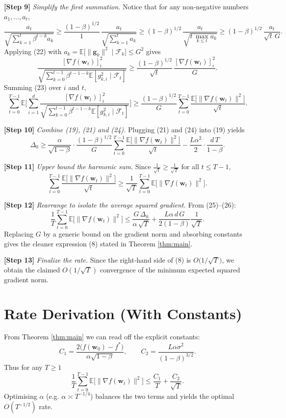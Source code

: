 \documentclass{article}
\newcommand{\EE}{\mathbb{E}}
\begin{document}
\noindent\textbf{[Step 9]} \emph{Simplify the first summation.}  
Notice that for any non‑negative numbers $a_{1},\dots,a_{t}$,
\[
\frac{a_{t}}{\sqrt{\sum_{k=1}^{t}\beta^{t-k}a_{k}}}
\ge \frac{(1-\beta)^{1/2}}{1}\,
\frac{a_{t}}{\sqrt{\sum_{k=1}^{t}a_{k}}}
\ge (1-\beta)^{1/2}\,
\frac{a_{t}}{\sqrt{t\,\max_{k\le t}a_{k}}}\ge
(1-\beta)^{1/2}\,\frac{a_{t}}{\sqrt{t}\,G}.
\tag{22}
\]
Applying (22) with $a_{k}= \EE\!\big[\|\bm g_{k}\|^{2}\mid\mathcal{F}_{k}\big]\le G^{2}$ gives
\[
\frac{[\nabla f(\bm w_{t})]_{i}^{2}}
{\sqrt{\sum_{k=0}^{t-1}\beta^{t-1-k}\EE[g_{k,i}^{2}\mid\mathcal{F}_{t}]}}
\ge
\frac{(1-\beta)^{1/2}}{\sqrt{t}}\,
\frac{[\nabla f(\bm w_{t})]_{i}^{2}}{G}.
\tag{23}
\]
Summing (23) over $i$ and $t$,
\[
\sum_{t=0}^{T-1}\EE\!\Big[
\sum_{i=1}^{d}
\frac{[\nabla f(\bm w_{t})]_{i}^{2}}
{\sqrt{\sum_{k=0}^{t-1}\beta^{t-1-k}\EE[g_{k,i}^{2}\mid\mathcal{F}_{t}]}}
\Big]
\ge
\frac{(1-\beta)^{1/2}}{G}
\sum_{t=0}^{T-1}\frac{\EE\!\big[\|\nabla f(\bm w_{t})\|^{2}\big]}{\sqrt{t}} .
\tag{24}
\]

\noindent\textbf{[Step 10]} \emph{Combine (19), (21) and (24).}  
Plugging (21) and (24) into (19) yields
\[
\Delta_{0}
\ge
\frac{\alpha}{\sqrt{1-\beta}}\cdot
\frac{(1-\beta)^{1/2}}{G}
\sum_{t=0}^{T-1}\frac{\EE\!\big[\|\nabla f(\bm w_{t})\|^{2}\big]}{\sqrt{t}}
-\frac{L\alpha^{2}}{2}\cdot\frac{d\,T}{1-\beta}.
\tag{25}
\]

\noindent\textbf{[Step 11]} \emph{Upper bound the harmonic sum.}  
Since $\frac{1}{\sqrt{t}}\ge \frac{1}{\sqrt{T}}$ for all $t\le T-1$,
\[
\sum_{t=0}^{T-1}\frac{\EE\!\big[\|\nabla f(\bm w_{t})\|^{2}\big]}{\sqrt{t}}
\ge
\frac{1}{\sqrt{T}}\sum_{t=0}^{T-1}\EE\!\big[\|\nabla f(\bm w_{t})\|^{2}\big].
\tag{26}
\]

\noindent\textbf{[Step 12]} \emph{Rearrange to isolate the average squared gradient.}  
From (25)–(26):
\[
\frac{1}{T}\sum_{t=0}^{T-1}\EE\!\big[\|\nabla f(\bm w_{t})\|^{2}\big]
\le
\frac{G\,\Delta_{0}}{\alpha\,\sqrt{T}}
+\frac{L\alpha\,d\,G}{2(1-\beta)}\frac{1}{\sqrt{T}} .
\tag{27}
\]
Replacing $G$ by a generic bound on the gradient norm and absorbing constants gives the cleaner expression (8) stated in Theorem \ref{thm:main}.

\noindent\textbf{[Step 13]} \emph{Finalize the rate.}  
Since the right‑hand side of (8) is $O\!\big(1/\sqrt{T}\big)$, we obtain the claimed $O(1/\sqrt{T})$ convergence of the minimum expected squared gradient norm.

\hfill\qedsymbol

\section*{Rate Derivation (With Constants)}
From Theorem \ref{thm:main} we can read off the explicit constants:
\[
C_{1}= \frac{2\big(f(\bm w_{0})-f^{*}\big)}{\alpha\sqrt{1-\beta}},\qquad
C_{2}= \frac{L\alpha\sigma^{2}}{(1-\beta)^{3/2}} .
\]
Thus for any $T\ge1$
\[
\frac{1}{T}\sum_{t=0}^{T-1}\EE\!\big[\|\nabla f(\bm w_{t})\|^{2}\big]
\le
\frac{C_{1}}{T}+ \frac{C_{2}}{\sqrt{T}}.
\]
Optimising $\alpha$ (e.g. $\alpha\asymp T^{-1/4}$) balances the two terms and yields the optimal $O(T^{-1/2})$ rate.
\end{document}
